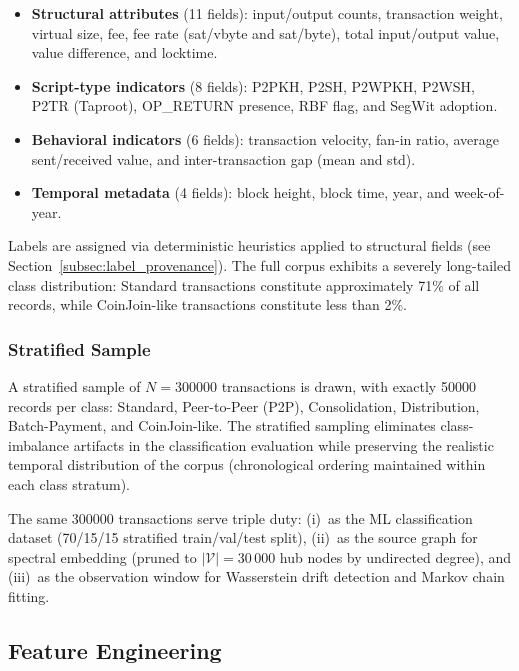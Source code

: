 \documentclass[journal]{IEEEtran}
\begin{document}
\begin{itemize}[leftmargin=*,itemsep=1pt]
  \item \textbf{Structural attributes} (11 fields): input/output counts,
    transaction weight, virtual size, fee, fee rate (sat/vbyte and sat/byte),
    total input/output value, value difference, and locktime.
  \item \textbf{Script-type indicators} (8 fields): P2PKH, P2SH, P2WPKH,
    P2WSH, P2TR (Taproot), OP\_RETURN presence, RBF flag, and SegWit adoption.
  \item \textbf{Behavioral indicators} (6 fields): transaction velocity,
    fan-in ratio, average sent/received value, and inter-transaction gap
    (mean and std).
  \item \textbf{Temporal metadata} (4 fields): block height, block time,
    year, and week-of-year.
\end{itemize}

Labels are assigned via deterministic heuristics applied to structural
fields (see Section~\ref{subsec:label_provenance}).  The full corpus
exhibits a severely long-tailed class distribution: Standard transactions
constitute approximately 71\% of all records, while CoinJoin-like
transactions constitute less than 2\%.

\subsubsection{Stratified Sample}
A stratified sample of $N = \num{300000}$ transactions is drawn, with exactly
\num{50000} records per class:
Standard, Peer-to-Peer (P2P), Consolidation, Distribution,
Batch-Payment, and CoinJoin-like.
The stratified sampling eliminates class-imbalance artifacts in the
classification evaluation while preserving the realistic temporal distribution
of the corpus (chronological ordering maintained within each class stratum).

The same \num{300000} transactions serve triple duty:
(i)~as the ML classification dataset (70/15/15 stratified train/val/test split),
(ii)~as the source graph for spectral embedding (pruned to $|\mathcal{V}| = 30\,000$
hub nodes by undirected degree), and
(iii)~as the observation window for Wasserstein drift detection and Markov chain
fitting.

\subsection{Feature Engineering}
\label{subsec:features}
\end{document}
